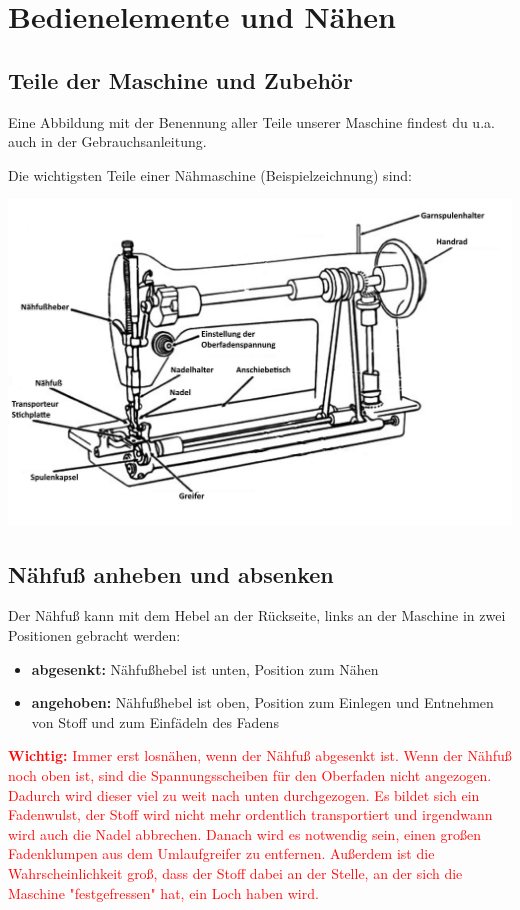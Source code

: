 \documentclass{\basedir/fablab-document}
\begin{document}
\pagebreak
\section{Bedienelemente und Nähen}

\subsection{Teile der Maschine und Zubehör}
Eine Abbildung mit der Benennung aller Teile unserer Maschine findest du u.a. auch in der Gebrauchsanleitung.

Die wichtigsten Teile einer Nähmaschine (Beispielzeichnung) sind:
\begin{center}
	\includegraphics[width=0.8\linewidth]{naehmaschine_wichtige_teile.jpg}
\end{center}

\subsection{Nähfuß anheben und absenken}
Der Nähfuß kann mit dem Hebel an der Rückseite, links an der Maschine in zwei Positionen gebracht werden:
\begin{itemize}
	\item \textbf{abgesenkt:} Nähfußhebel ist unten, Position zum Nähen
	\item \textbf{angehoben:} Nähfußhebel ist oben, Position zum Einlegen und Entnehmen von Stoff und zum Einfädeln des Fadens
\end{itemize}

\textcolor{red}{
	\textbf{Wichtig:} Immer erst losnähen, wenn der Nähfuß abgesenkt ist. Wenn der Nähfuß noch oben ist, sind die Spannungsscheiben für den Oberfaden nicht angezogen. 
	Dadurch wird dieser viel zu weit nach unten durchgezogen. Es bildet sich ein Fadenwulst, der Stoff wird nicht mehr ordentlich transportiert und irgendwann wird auch die Nadel abbrechen. Danach wird es notwendig sein, einen großen Fadenklumpen aus dem Umlaufgreifer zu entfernen. 
	Außerdem ist die Wahrscheinlichkeit groß, dass der Stoff dabei an der Stelle, an der sich die Maschine "festgefressen" hat, ein Loch haben wird.
}
\end{document}
